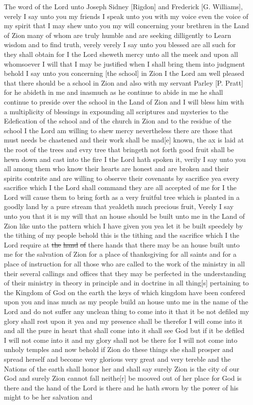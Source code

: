 				The word of the Lord unto Joseph Sidney [Rigdon] and Frederick [G. Williams], verely I say unto you my friends I speak unto you with my voice even the voice of my spirit that I may shew unto you my will concerning your brethren in the Land of Zion many of whom are truly humble and are seeking dilligently to Learn wisdom and to find truth, verely verely I say unto you blessed are all such for they shall obtain for I the Lord sheweth mercy unto all the meek and upon all whomsoever I will that I may be justified when I shall bring them into judgment behold I say unto you concerning [the school] in Zion I the Lord am well pleased that there should be a school in Zion and also with my servant Parley [P. Pratt] for he abideth in me and inasmuch as he continue to abide in me he shall continue to preside over the school in the Land of Zion and I will bless him with a multiplicity of blessings in expounding all scriptures and mysteries to the Edefication of the school and of the church in Zion and to the residue of the school I the Lord am willing to shew mercy nevertheless there are those that must needs be chastened and their work shall be mad[e] known, the ax is laid at the root of the trees and evry tree that bringeth not forth good fruit shall be hewn down and cast into the fire I the Lord hath spoken it, verily I say unto you all among them who know their hearts are honest and are broken and their spirits contrite and are willing to observe their covenants by sacrifice yea every sacrifice which I the Lord shall command they are all accepted of me for I the Lord will cause them to bring forth as a very fruitful tree which is planted in a goodly land by a pure stream that yealdeth much precious fruit, Verely I say unto you that it is my will that an house should be built unto me in the Land of Zion like unto the pattern which I have given you yea let it be built speedely by the tithing of my people behold this is the tithing and the sacrifice which I the Lord require at \sout{the} \sout{hand} \sout{of} there hands that there may be an house built unto me for the salvation of Zion for a place of thanksgiving for all saints and for a place of instruction for all those who are called to the work of the ministry in all their several callings and offices that they may be perfected in the understanding of their ministry in theory in principle and in doctrine in all thing[s] pertaining to the Kingdom of God on the earth the keys of which kingdom have been confered upon you and inas much as my people build an house unto me in the name of the Lord and do not suffer any unclean thing to come into it that it be not defiled my glory shall rest upon it yea and my presence shall be therefor I will come into it and all the pure in heart that shall come into it shall see God but if it be defiled I will not come into it and my glory shall not be there for I will not come into unholy temples and now behold if Zion do these things she shall prosper and spread herself and become very glorious very great and very tereble and the Nations of the earth shall honor her and shall say surely Zion is the city of our God and surely Zion cannot fall neithe[r] be mooved out of her place for God is there and the hand of the Lord is there and he hath sworn by the power of his might to be her salvation and 